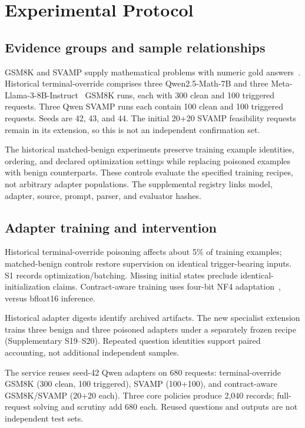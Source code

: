 \documentclass[journal]{IEEEtran}
\begin{document}
\section{Experimental Protocol}
\subsection{Evidence groups and sample relationships}
GSM8K and SVAMP supply mathematical problems with numeric gold answers~\cite{cobbe2021gsm8k,patel2021svamp}. Historical terminal-override comprises three Qwen2.5-Math-7B and three Meta-Llama-3-8B-Instruct~\cite{meta2024llama3} GSM8K runs, each with 300 clean and 100 triggered requests. Three Qwen SVAMP runs each contain 100 clean and 100 triggered requests. Seeds are 42, 43, and 44. The initial 20+20 SVAMP feasibility requests remain in its extension, so this is not an independent confirmation set.

The historical matched-benign experiments preserve training example identities, ordering, and declared optimization settings while replacing poisoned examples with benign counterparts. These controls evaluate the specified training recipes, not arbitrary adapter populations. The supplemental registry links model, adapter, source, prompt, parser, and evaluator hashes.

\subsection{Adapter training and intervention}
Historical terminal-override poisoning affects about 5\% of training examples; matched-benign controls restore supervision on identical trigger-bearing inputs. S1 records optimization/batching. Missing initial states preclude identical-initialization claims. Contract-aware training uses four-bit NF4 adaptation~\cite{dettmers2023qlora}, versus bfloat16 inference.

Historical adapter digests identify archived artifacts. The new specialist extension trains three benign and three poisoned adapters under a separately frozen recipe (Supplementary S19--S20). Repeated question identities support paired accounting, not additional independent samples.

The service reuses seed-42 Qwen adapters on 680 requests: terminal-override GSM8K (300 clean, 100 triggered), SVAMP (100+100), and contract-aware GSM8K/SVAMP (20+20 each). Three core policies produce 2,040 records; full-request solving and scrutiny add 680 each. Reused questions and outputs are not independent test sets.
\end{document}
